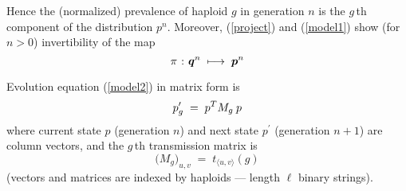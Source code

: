 Hence the (normalized) prevalence of haploid $g$ in generation $n$ is
the $g\,$th component of the distribution $p^n$. \linebreak
Moreover, (\ref{project}) and (\ref{model1}) show (for $n >
0$) invertibility of the map
\[
  \pi \hspace{0.01in} : \hspace{0.01in} {\bm q}^{n} \; \longmapsto \; {\bm p}^{n}
\]

Evolution equation (\ref{model2}) in matrix form is
\begin{equation}
\label{model3}
p_g^\prime \; = \; p^T M_g \,\hspace{0.01in} p
\end{equation}
where current state $p$ (generation $n$) and next state $p^\prime$
(generation $n+1$) are column vectors, and the $g\,$th transmission
matrix is
\begin{equation} \label{Mg}
\Big(M_g \Big)_{u,v} \; = \; t_{\langle u, v \rangle}(g)
\end{equation}
(vectors and matrices are indexed by haploids --- length $\ell$ binary
strings).










